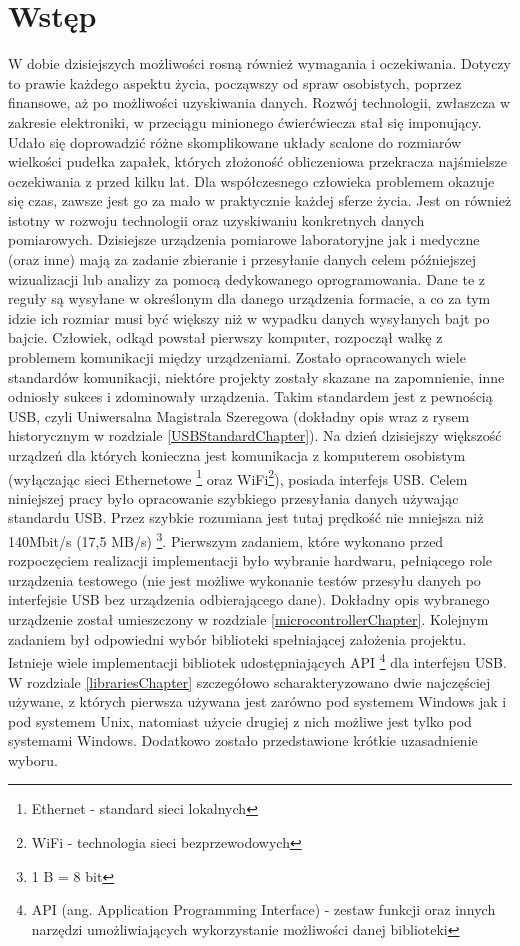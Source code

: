 \documentclass{BscUS}
\begin{document}
\chapter{Wstęp}
\label{beginChapter}
\pagestyle{fancy}
W dobie dzisiejszych możliwości rosną również wymagania i oczekiwania. Dotyczy to prawie każdego aspektu życia, począwszy od spraw osobistych, poprzez finansowe, aż po możliwości uzyskiwania danych. Rozwój technologii, zwłaszcza w zakresie elektroniki, w przeciągu minionego ćwierćwiecza stał się imponujący. Udało się doprowadzić różne skomplikowane układy scalone do rozmiarów wielkości pudełka zapałek, których złożoność obliczeniowa przekracza najśmielsze oczekiwania z przed kilku lat. Dla współczesnego człowieka problemem okazuje się czas, zawsze jest go za mało w praktycznie każdej sferze życia. Jest on również istotny w rozwoju technologii oraz uzyskiwaniu konkretnych danych pomiarowych.
\newline
\indent Dzisiejsze urządzenia pomiarowe laboratoryjne jak i medyczne (oraz inne) mają za zadanie zbieranie i przesyłanie danych celem późniejszej wizualizacji lub analizy za pomocą dedykowanego oprogramowania. Dane te z reguły są wysyłane w określonym dla danego urządzenia formacie, a co za tym idzie ich rozmiar musi być większy niż w wypadku danych wysyłanych bajt po bajcie.
\newline
\indent Człowiek, odkąd powstał pierwszy komputer, rozpoczął walkę z problemem komunikacji między urządzeniami. Zostało opracowanych wiele standardów komunikacji, niektóre projekty zostały skazane na zapomnienie, inne odniosły sukces i zdominowały urządzenia. Takim standardem jest z pewnością USB, czyli Uniwersalna Magistrala Szeregowa (dokładny opis wraz z rysem historycznym w rozdziale \ref{USBStandardChapter}). Na dzień dzisiejszy większość urządzeń dla których konieczna jest komunikacja z komputerem osobistym (wyłączając sieci Ethernetowe \footnote{Ethernet - standard sieci lokalnych} oraz WiFi\footnote{WiFi - technologia sieci bezprzewodowych}), posiada interfejs USB.
\newline
\indent Celem niniejszej pracy było opracowanie szybkiego przesyłania danych używając standardu USB. Przez szybkie rozumiana jest tutaj prędkość nie mniejsza niż 140Mbit/s (17,5 MB/s) \footnote{1 B = 8 bit}.
\newline
\indent Pierwszym zadaniem, które wykonano przed rozpoczęciem realizacji implementacji było wybranie hardwaru, pełniącego role urządzenia testowego (nie jest możliwe wykonanie testów przesyłu danych po interfejsie USB bez urządzenia odbierającego dane). Dokładny opis wybranego urządzenie został umieszczony w rozdziale \ref{microcontrollerChapter}. Kolejnym zadaniem był odpowiedni wybór biblioteki spełniającej założenia projektu. Istnieje wiele implementacji bibliotek udostępniających API \footnote{API (ang. Application Programming Interface) - zestaw funkcji oraz innych narzędzi umożliwiających wykorzystanie możliwości danej biblioteki} dla interfejsu USB. W rozdziale \ref{librariesChapter} szczegółowo scharakteryzowano dwie najczęściej używane, z których pierwsza używana jest zarówno pod systemem Windows jak i pod systemem Unix, natomiast użycie drugiej z nich możliwe jest tylko pod systemami Windows. Dodatkowo zostało przedstawione krótkie uzasadnienie wyboru.
\end{document}
